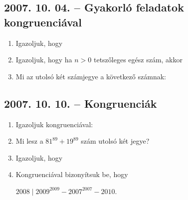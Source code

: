 \subsection*{2007. 10. 04. -- Gyakorló feladatok kongruenciával}
\begin{enumerate}
\item Igazoljuk, hogy
\item Igazoljuk, hogy ha $n>0$ tetszőleges egész szám, akkor
\item Mi az utolsó két számjegye a következő számnak:
\end{enumerate}


\subsection*{2007. 10. 10. -- Kongruenciák}
\begin{enumerate}
\item Igazoljuk kongruenciával:
\item Mi lesz a $81^{89}+19^{89}$ szám utolsó két jegye?
\item Igazoljuk, hogy
\item Kongruenciával bizonyítsuk be, hogy

$2008 \mid 2009^{2009}-2007^{2007}-2010$.
\end{enumerate}


